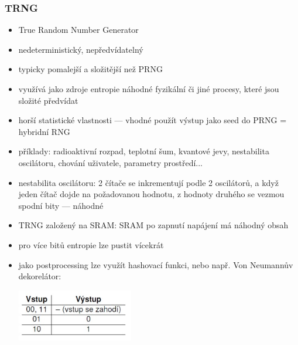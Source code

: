 \subsubsection*{TRNG}
\begin{itemize}
	\item True Random Number Generator
	\item nedeterministický, nepředvídatelný
	\item typicky pomalejší a složitější než PRNG
	\item využívá jako zdroje entropie náhodné fyzikální či jiné procesy, které jsou složité předvídat
	\item horší statistické vlastnosti --- vhodné použít výstup jako seed do PRNG = hybridní RNG
	
	\item příklady: radioaktivní rozpad, teplotní šum, kvantové jevy, nestabilita oscilátoru, chování uživatele, parametry prostředí...
	\item nestabilita oscilátoru: 2 čítače se inkrementují podle 2 oscilátorů, a když jeden čítač dojde na požadovanou hodnotu, z hodnoty druhého se vezmou spodní bity --- náhodné
	\item TRNG založený na SRAM: SRAM po zapnutí napájení má náhodný obsah
	\item pro více bitů entropie lze pustit vícekrát
	\item jako postprocessing lze využít hashovací funkci, nebo např. Von Neumannův dekorelátor:
	
	\includegraphics[width=0.4\textwidth]{img/OB-19.jpg}
\end{itemize}
